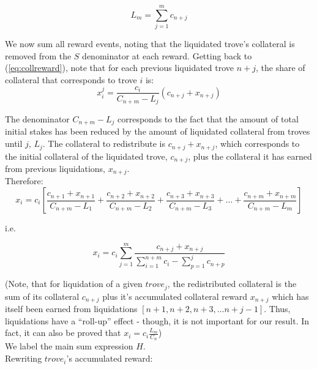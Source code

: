 \documentclass[reqno]{article}
\begin{document}
\begin{equation} 
    L_m=\sum\limits^m_{j=1}c_{n+j}
\end{equation}

\bigskip
We now sum all reward events, noting that the liquidated trove’s collateral is removed from the $S$ denominator at each reward. Getting back to (\ref{eq:collreward}), note that for each previous liquidated trove $n+j$, the share of collateral that corresponds to trove $i$ is: \\

\begin{equation} 
  x_i^j = \frac{c_i}{C_{n+m}-L_j}(c_{n+j}+x_{n+j})
\end{equation}

The denominator $C_{n+m}-L_j$ corresponds to the fact that the amount of total initial stakes has been reduced by the amount of liquidated collateral from  troves until $j$, $L_j$. The collateral to redistribute is $c_{n+j}+x_{n+j}$, which corresponds to the initial collateral of the liquidated trove, $c_{n+j}$, plus the collateral it has earned from previous liquidations, $x_{n+j}$. \\

Therefore:\\

\begin{equation} 
    x_i=c_i\left[\frac{c_{n+1}+x_{n+1}}{C_{n+m}-L_1}+\frac{c_{n+2}+x_{n+2}}{C_{n+m}-L_2}+\frac{c_{n+3}+x_{n+3}}{C_{n+m}-L_3}+...+\frac{c_{n+m}+x_{n+m}}{C_{n+m}-L_m}\right]
\end{equation}

\bigskip
i.e.

\begin{equation} 
    x_i=c_i\sum\limits^m_{j=1}\frac{c_{n+j}+x_{n+j}}{\sum\limits^{n+m}_{i=1}c_i-\sum\limits^j_{p=1}c_{n+p}}
\end{equation}

\bigskip
(Note, that for liquidation of a given $trove_j$, the redistributed collateral is the sum of its collateral $c_{n+j}$ plus it’s accumulated collateral reward $x_{n+j}$ which has itself been earned from liquidations $[n+1, n+2, n+3, … n+j-1]$.  Thus, liquidations have a “roll-up” effect - though, it is not important for our result. In fact, it can also be proved that $x_i=c_i\frac{L_m}{C_n}$)\\

We label the main sum expression $H$.\\

Rewriting $trove_i$’s accumulated reward:
\end{document}
